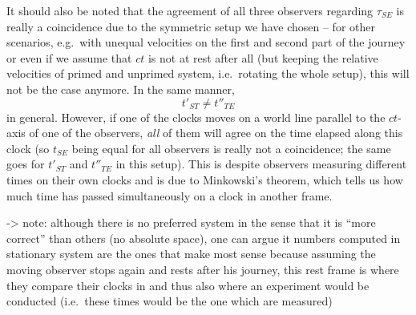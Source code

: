 \documentclass[../relativity_main.tex]{subfiles}
\begin{document}
\begin{ex}
	It should also be noted that the agreement of all three observers regarding $\tau_{SE}$ is really a coincidence due to the symmetric setup we have chosen -- for other scenarios, e.g.~with unequal velocities on the first and second part of the journey or even if we assume that $ct$ is not at rest after all (but keeping the relative velocities of primed and unprimed system, i.e.~rotating the whole setup), this will not be the case anymore. In the same manner,
	\begin{equation*}
		t'_{ST} \neq t''_{TE}
	\end{equation*}
	in general. However, if one of the clocks moves on a world line parallel to the $ct$-axis of one of the observers, \emph{all} of them will agree on the time elapsed along this clock (so $t_{SE}$ being equal for all observers is really not a coincidence; the same goes for $t'_{ST}$ and $t''_{TE}$ in this setup). This is despite observers measuring different times on their own clocks and is due to Minkowski's theorem, which tells us how much time has passed simultaneously on a clock in another frame.


-> note: although there is no preferred system in the sense that it is \enquote{more correct} than others (no absolute space), one can argue it numbers computed in stationary system are the ones that make most sense because assuming the moving observer stops again and rests after his journey, this rest frame is where they compare their clocks in and thus also where an experiment would be conducted (i.e.~these times would be the one which are measured)
\end{ex}
\end{document}
